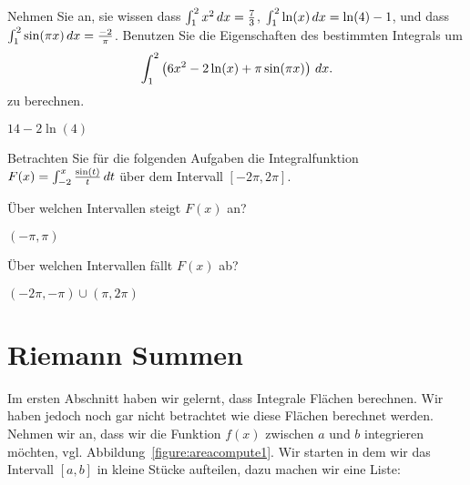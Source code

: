 \begin{exercises}
\begin{exercise}
Nehmen Sie an, sie wissen dass $\int_{1}^2 x^2 \, d x = \frac{7}{3}$, $\int_1^2
\ln(x)\, d x = \ln(4) - 1$, und dass $\int_1^2 \sin(\pi x) \, d x =
\frac{-2}{\pi}$. Benutzen Sie die Eigenschaften des bestimmten Integrals um
\[
\int_1^2 \left(6 x^2  - 2 \ln(x) +\pi \sin(\pi x) \right) \, d x.
\]
zu berechnen.
\begin{answer}
$14 -2 \ln(4)$
\end{answer}
\end{exercise}


\noindent Betrachten Sie für die folgenden Aufgaben die Integralfunktion $F(x) = \int_{-2}^x \frac{\sin(t)}{t} \, d t$ über dem Intervall
$[-2\pi,2\pi]$.

\begin{exercise} Über welchen Intervallen steigt $F(x)$ an?
\begin{answer}
$(-\pi,\pi)$
\end{answer}
\end{exercise}

\begin{exercise} Über welchen Intervallen fällt $F(x)$ ab?
\begin{answer}
$(-2\pi,-\pi)\cup(\pi,2\pi)$
\end{answer}
\end{exercise}

\end{exercises}




\section{Riemann Summen}

Im ersten Abschnitt haben wir gelernt, dass Integrale Flächen berechnen. Wir haben jedoch noch gar nicht betrachtet wie diese Flächen berechnet werden. Nehmen wir an, dass wir die Funktion $f(x)$ zwischen $a$ und $b$ integrieren möchten, vgl. Abbildung~\ref{figure:areacompute1}. Wir starten in dem wir das Intervall $[a,b]$ in kleine Stücke aufteilen, dazu machen wir eine Liste:

